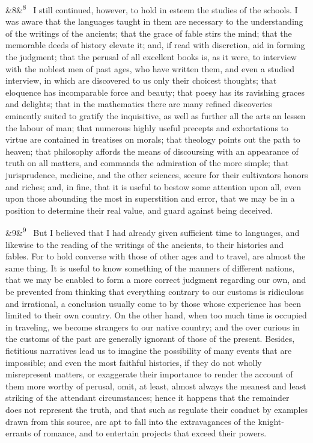 \documentclass[12pt]{article}
\newcommand{\para}[1][]{\par\noindent\ifx&#1&\else\textsuperscript{\footnotesize #1}~\fi}
\begin{document}
\para[8] I still continued, however, to hold in esteem the studies of the schools. I was aware that the languages taught in them are necessary to the understanding of the writings of the ancients; that the grace of fable stirs the mind; that the memorable deeds of history elevate it; and, if read with discretion, aid in forming the judgment; that the perusal of all excellent books is, as it were, to interview with the noblest men of past ages, who have written them, and even a studied interview, in which are discovered to us only their choicest thoughts; that eloquence has incomparable force and beauty; that poesy has its ravishing graces and delights; that in the mathematics there are many refined discoveries eminently suited to gratify the inquisitive, as well as further all the arts an lessen the labour of man; that numerous highly useful precepts and exhortations to virtue are contained in treatises on morals; that theology points out the path to heaven; that philosophy affords the means of discoursing with an appearance of truth on all matters, and commands the admiration of the more simple; that jurisprudence, medicine, and the other sciences, secure for their cultivators honors and riches; and, in fine, that it is useful to bestow some attention upon all, even upon those abounding the most in superstition and error, that we may be in a position to determine their real value, and guard against being deceived.

\para[9] But I believed that I had already given sufficient time to languages, and likewise to the reading of the writings of the ancients, to their histories and fables. For to hold converse with those of other ages and to travel, are almost the same thing. It is useful to know something of the manners of different nations, that we may be enabled to form a more correct judgment regarding our own, and be prevented from thinking that everything contrary to our customs is ridiculous and irrational, a conclusion usually come to by those whose experience has been limited to their own country. On the other hand, when too much time is occupied in traveling, we become strangers to our native country; and the over curious in the customs of the past are generally ignorant of those of the present. Besides, fictitious narratives lead us to imagine the possibility of many events that are impossible; and even the most faithful histories, if they do not wholly misrepresent matters, or exaggerate their importance to render the account of them more worthy of perusal, omit, at least, almost always the meanest and least striking of the attendant circumstances; hence it happens that the remainder does not represent the truth, and that such as regulate their conduct by examples drawn from this source, are apt to fall into the extravagances of the knight-errants of romance, and to entertain projects that exceed their powers.
\end{document}
